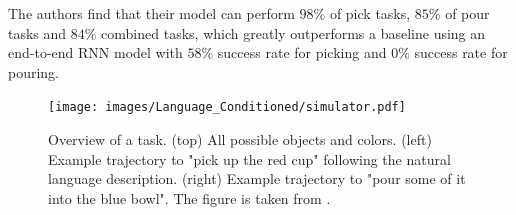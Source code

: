 The authors find that their model can perform $98 \%$ of pick tasks, $85 \%$ of pour tasks and $84 \%$ combined 
tasks, which greatly outperforms a baseline using an end-to-end RNN model with $58\%$ success rate for picking and $0 \%$ success rate for pouring.

\begin{figure}[htbp]
    \centering
    \texttt{[image: images/Language\_Conditioned/simulator.pdf]}
    \caption{Overview of a task. (top) All possible objects and colors. (left) Example trajectory to "pick up the red cup" following the natural language description. 
    (right) Example trajectory to "pour some of it into the blue bowl". The figure is taken from \cite{stepputtis2020languageconditioned}.}
    \label{lang_imi_expl}
\end{figure}
